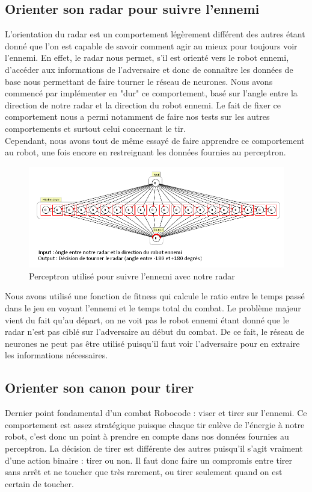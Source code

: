 \documentclass[a4paper,11pt]{article}
\begin{document}
\subsection{Orienter son radar pour suivre l'ennemi}
L'orientation du radar est un comportement légèrement différent des autres étant donné que l'on est capable de savoir comment agir au mieux pour toujours voir l'ennemi. En effet, le radar nous permet, s'il est orienté vers le robot ennemi, d'accéder aux informations de l'adversaire et donc de connaître les données de base nous permettant de faire tourner le réseau de neurones. Nous avons commencé par implémenter en "dur" ce comportement, basé sur l'angle entre la direction de notre radar et la direction du robot ennemi. Le fait de fixer ce comportement nous a permi notamment de faire nos tests sur les autres comportements et surtout celui concernant le tir. \\
Cependant, nous avons tout de même essayé de faire apprendre ce comportement au robot, une fois encore en restreignant les données fournies au perceptron.

\begin{figure}[!h]
\centering
\includegraphics{images/radar_network.png}
\caption{Perceptron utilisé pour suivre l'ennemi avec notre radar}
\label{radar_perceptron}
\end{figure}

Nous avons utilisé une fonction de fitness qui calcule le ratio entre le temps passé dans le jeu en voyant l'ennemi et le temps total du combat. Le problème majeur vient du fait qu'au départ, on ne voit pas le robot ennemi étant donné que le radar n'est pas ciblé sur l'adversaire au début du combat. De ce fait, le réseau de neurones ne peut pas être utilisé puisqu'il faut voir l'adversaire pour en extraire les informations nécessaires.


\subsection{Orienter son canon pour tirer}
Dernier point fondamental d'un combat Robocode : viser et tirer sur l'ennemi. Ce comportement est assez stratégique puisque chaque tir enlève de l'énergie à notre robot, c'est donc un point à prendre en compte dans nos données fournies au perceptron. La décision de tirer est différente des autres puisqu'il s'agit vraiment d'une action binaire : tirer ou non. Il faut donc faire un compromis entre tirer sans arrêt et ne toucher que très rarement, ou tirer seulement quand on est certain de toucher.
\end{document}
